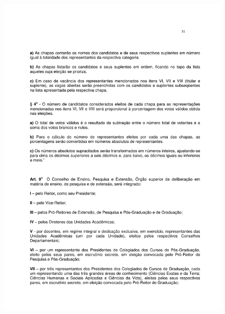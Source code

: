 \begin{figure}[p]
	\centering 
	\includegraphics[scale=0.7]{capitulos/resolucoes/cuni414/cuni414-31.pdf}
\end{figure} \pagebreak

